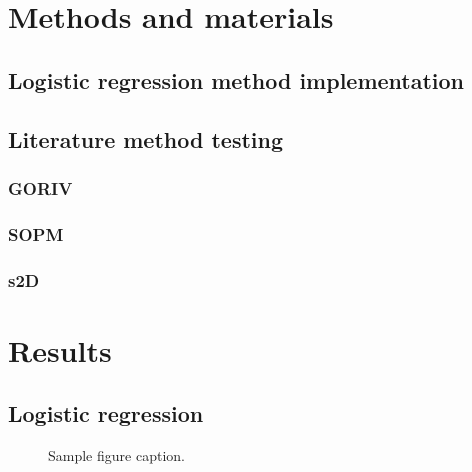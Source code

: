 \documentclass{article}
\begin{document}
\section{Methods and materials}

\subsection{Logistic regression method implementation}

\subsection{Literature method testing}

\subsubsection{GORIV}

\subsubsection{SOPM}

\subsubsection{s2D}


\section{Results}

\subsection{Logistic regression}

\begin{figure}[h]
  \centering
  \caption{Sample figure caption.}
\end{figure}
\end{document}
